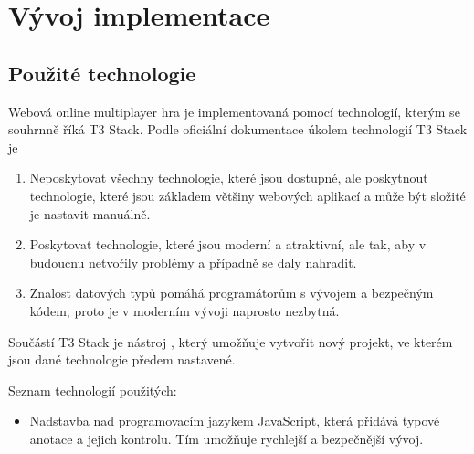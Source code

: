 \chapter{Vývoj implementace}

\section{Použité technologie}

Webová online multiplayer hra je implementovaná pomocí technologií, kterým se souhrnně říká T3 Stack. Podle oficiální dokumentace \parencite{t3stack} úkolem technologií T3 Stack je

\begin{enumerate}
    \item {} Neposkytovat všechny technologie, které jsou dostupné, ale poskytnout technologie, které jsou základem většiny webových aplikací a může být složité je nastavit manuálně.
    \item {} Poskytovat technologie, které jsou moderní a atraktivní, ale tak, aby v budoucnu netvořily problémy a případně se daly nahradit.
    \item {} Znalost datových typů pomáhá programátorům s vývojem a bezpečným kódem, proto je v moderním vývoji naprosto nezbytná.
\end{enumerate}


Součástí T3 Stack je nástroj , který umožňuje vytvořit nový projekt, ve kterém jsou dané technologie předem nastavené.

Seznam technologií použitých:
\begin{itemize}
    \item {} Nadstavba nad programovacím jazykem JavaScript, která přidává typové anotace a jejich kontrolu. Tím umožňuje rychlejší a bezpečnější vývoj.
\end{itemize}

